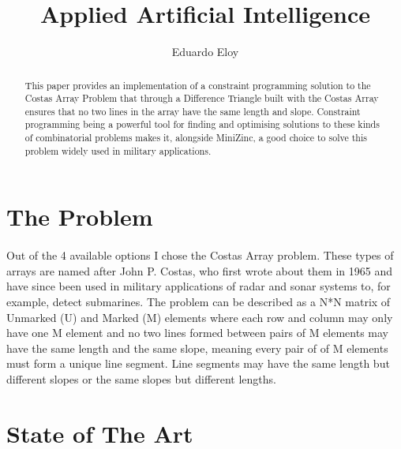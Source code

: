 \documentclass[runningheads]{llncs}
\begin{document}
\title{Applied Artificial Intelligence}

\author{Eduardo Eloy}



\maketitle              

\begin{abstract}
This paper provides an implementation of a constraint programming solution to the Costas Array Problem that through a Difference Triangle built with the Costas Array ensures that no two lines in the array have the same length and slope.
Constraint programming being a powerful tool for finding and optimising solutions to these kinds of combinatorial problems makes it, alongside MiniZinc, a good choice to solve this problem widely used in military applications.


\end{abstract}

\section{The Problem}
\paragraph{}

Out of the 4 available options I chose the Costas Array problem\cite{costasp}. These types of arrays are named after John P. Costas\cite{costas}, who first wrote about them in 1965 and have since been used in military applications of radar and sonar systems to, for example, detect submarines.
The problem can be described as a N*N matrix of Unmarked (U) and Marked (M) elements where each row and column may only have one M element and no two lines formed between pairs of M elements may have the same length and the same slope, meaning every pair of of M elements must form a unique line segment.
Line segments may have the same length but different slopes or the same slopes but different lengths.


\section{State of The Art}
\paragraph{}
\end{document}
